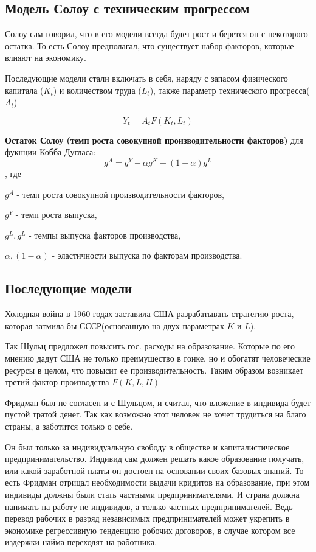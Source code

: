 \documentclass[reqno]{article}
\theoremstyle{definition}
\theoremstyle{definition}
\theoremstyle{definition}
\theoremstyle{definition}
\theoremstyle{definition}
\theoremstyle{definition}
\theoremstyle{definition}
\theoremstyle{definition}
\theoremstyle{definition}
\begin{document}
		\subsection{Модель Солоу с техническим прогрессом}
		
		Солоу сам говорил, что в его модели всегда будет рост и берется он с некоторого остатка. То есть Солоу предполагал, что существует набор факторов, которые влияют на экономику.
		
		Последующие модели стали включать в себя, наряду с запасом физического капитала ($K_t$) и количеством труда ($L_t$), также параметр технического прогресса($A_t$)
		
		$$Y_t = A_t F(K_t,L_t)$$
		
		\textbf{Остаток Солоу (темп роста совокупной производительности факторов)} для фукнции Кобба-Дугласа:
		$$g^A = g^Y - \alpha g^K - (1 - \alpha) g^L$$
		, где
		
		$g^A$ - темп роста совокупной производительности факторов,
		
		$g^Y$ - темп роста выпуска,
		
		$g^L, g^L$ - темпы выпуска факторов производства,
		
		$\alpha, (1 - \alpha)$ - эластичности выпуска по факторам производства.
		
		\subsection{Последующие модели}
	Холодная война в 1960 годах заставила США разрабатывать стратегию роста, которая затмила бы СССР(основанную на двух параметрах $K$ и $L$).
	
	Так Шульц предложел повысить гос. расходы на образование. Которые по его мнению дадут США не только преимущество в гонке, но и обогатят человеческие ресурсы в целом, что повысит ее производительность. Таким образом возникает третий фактор производства $F(K, L, H)$
	
	Фридман был не согласен и с Шульцом, и считал, что вложение в индивида будет пустой тратой денег. Так как возможно этот человек не хочет трудиться на благо страны, а  заботится только о себе.
	
	Он был только за индивидуальную свободу в обществе и капиталистическое предпринимательство. Индивид сам должен решать какое образование получать, или какой заработной платы он достоен на основании своих базовых знаний. То есть Фридман отрицал необходимости выдачи кридитов на образование, при этом индивиды должны были стать частными предпринимателями. И страна должна нанимать на работу не индивидов, а только частных предпринимателей. Ведь перевод рабочих в разряд независимых предпринимателей может укрепить в экономике регрессивную тенденцию робочих договоров, в случае котором все издержки найма переходят на работника.  
	
\end{document}
